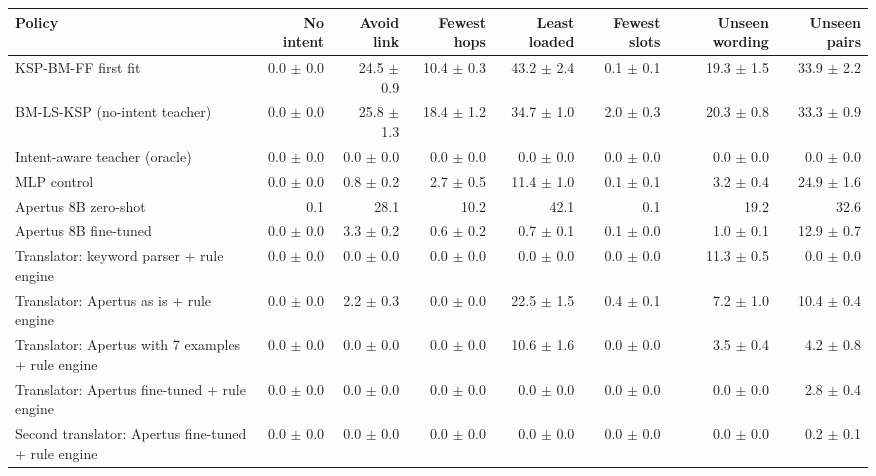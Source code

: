 \begin{tabular}{lrrrrrrr}
\toprule
Policy & No intent & Avoid link & Fewest hops & Least loaded & Fewest slots & Unseen wording & Unseen pairs \\
\midrule
KSP-BM-FF first fit & 0.0 $\pm$ 0.0 & 24.5 $\pm$ 0.9 & 10.4 $\pm$ 0.3 & 43.2 $\pm$ 2.4 & 0.1 $\pm$ 0.1 & 19.3 $\pm$ 1.5 & 33.9 $\pm$ 2.2 \\
BM-LS-KSP (no-intent teacher) & 0.0 $\pm$ 0.0 & 25.8 $\pm$ 1.3 & 18.4 $\pm$ 1.2 & 34.7 $\pm$ 1.0 & 2.0 $\pm$ 0.3 & 20.3 $\pm$ 0.8 & 33.3 $\pm$ 0.9 \\
Intent-aware teacher (oracle) & 0.0 $\pm$ 0.0 & 0.0 $\pm$ 0.0 & 0.0 $\pm$ 0.0 & 0.0 $\pm$ 0.0 & 0.0 $\pm$ 0.0 & 0.0 $\pm$ 0.0 & 0.0 $\pm$ 0.0 \\
MLP control & 0.0 $\pm$ 0.0 & 0.8 $\pm$ 0.2 & 2.7 $\pm$ 0.5 & 11.4 $\pm$ 1.0 & 0.1 $\pm$ 0.1 & 3.2 $\pm$ 0.4 & 24.9 $\pm$ 1.6 \\
Apertus 8B zero-shot & 0.1 & 28.1 & 10.2 & 42.1 & 0.1 & 19.2 & 32.6 \\
Apertus 8B fine-tuned & 0.0 $\pm$ 0.0 & 3.3 $\pm$ 0.2 & 0.6 $\pm$ 0.2 & 0.7 $\pm$ 0.1 & 0.1 $\pm$ 0.0 & 1.0 $\pm$ 0.1 & 12.9 $\pm$ 0.7 \\
Translator: keyword parser + rule engine & 0.0 $\pm$ 0.0 & 0.0 $\pm$ 0.0 & 0.0 $\pm$ 0.0 & 0.0 $\pm$ 0.0 & 0.0 $\pm$ 0.0 & 11.3 $\pm$ 0.5 & 0.0 $\pm$ 0.0 \\
Translator: Apertus as is + rule engine & 0.0 $\pm$ 0.0 & 2.2 $\pm$ 0.3 & 0.0 $\pm$ 0.0 & 22.5 $\pm$ 1.5 & 0.4 $\pm$ 0.1 & 7.2 $\pm$ 1.0 & 10.4 $\pm$ 0.4 \\
Translator: Apertus with 7 examples + rule engine & 0.0 $\pm$ 0.0 & 0.0 $\pm$ 0.0 & 0.0 $\pm$ 0.0 & 10.6 $\pm$ 1.6 & 0.0 $\pm$ 0.0 & 3.5 $\pm$ 0.4 & 4.2 $\pm$ 0.8 \\
Translator: Apertus fine-tuned + rule engine & 0.0 $\pm$ 0.0 & 0.0 $\pm$ 0.0 & 0.0 $\pm$ 0.0 & 0.0 $\pm$ 0.0 & 0.0 $\pm$ 0.0 & 0.0 $\pm$ 0.0 & 2.8 $\pm$ 0.4 \\
Second translator: Apertus fine-tuned + rule engine & 0.0 $\pm$ 0.0 & 0.0 $\pm$ 0.0 & 0.0 $\pm$ 0.0 & 0.0 $\pm$ 0.0 & 0.0 $\pm$ 0.0 & 0.0 $\pm$ 0.0 & 0.2 $\pm$ 0.1 \\
\bottomrule
\end{tabular}


